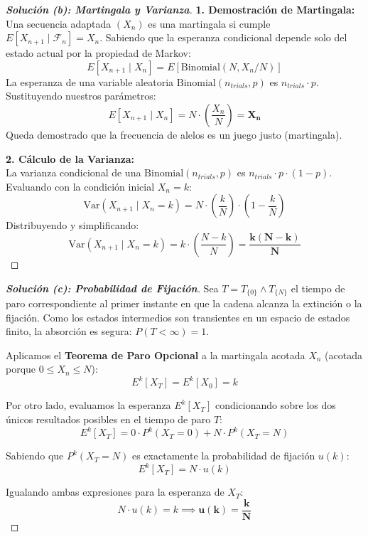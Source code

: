 \documentclass[10pt,a4paper]{article}
\begin{document}
\begin{proof}[\textbf{Solución (b): Martingala y Varianza}]
    \textbf{1. Demostración de Martingala:} \\
    Una secuencia adaptada $(X_n)$ es una martingala si cumple $E[X_{n+1} \mid \mathcal{F}_n] = X_n$.
    Sabiendo que la esperanza condicional depende solo del estado actual por la propiedad de Markov:
    \[ E[X_{n+1} \mid X_n] = E[\text{Binomial}(N, X_n/N)] \]
    La esperanza de una variable aleatoria $\text{Binomial}(n_{trials}, p)$ es $n_{trials} \cdot p$. Sustituyendo nuestros parámetros:
    \[ E[X_{n+1} \mid X_n] = N \cdot \left( \frac{X_n}{N} \right) = \mathbf{X_n} \]
    Queda demostrado que la frecuencia de alelos es un juego justo (martingala).
    
    \textbf{2. Cálculo de la Varianza:} \\
    La varianza condicional de una $\text{Binomial}(n_{trials}, p)$ es $n_{trials} \cdot p \cdot (1-p)$. Evaluando con la condición inicial $X_n = k$:
    \[ \text{Var}(X_{n+1} \mid X_n = k) = N \cdot \left(\frac{k}{N}\right) \cdot \left(1 - \frac{k}{N}\right) \]
    Distribuyendo y simplificando:
    \[ \text{Var}(X_{n+1} \mid X_n = k) = k \cdot \left( \frac{N-k}{N} \right) = \mathbf{\frac{k(N-k)}{N}} \]
\end{proof}

\vspace{5mm}

\begin{proof}[\textbf{Solución (c): Probabilidad de Fijación}]
    Sea $T = T_{\{0\}} \wedge T_{\{N\}}$ el tiempo de paro correspondiente al primer instante en que la cadena alcanza la extinción o la fijación. Como los estados intermedios son transientes en un espacio de estados finito, la absorción es segura: $P(T < \infty) = 1$.
    
    Aplicamos el \textbf{Teorema de Paro Opcional} a la martingala acotada $X_n$ (acotada porque $0 \le X_n \le N$):
    \[ E^k[X_T] = E^k[X_0] = k \]
    
    Por otro lado, evaluamos la esperanza $E^k[X_T]$ condicionando sobre los dos únicos resultados posibles en el tiempo de paro $T$:
    \[ E^k[X_T] = 0 \cdot P^k(X_T = 0) + N \cdot P^k(X_T = N) \]
    
    Sabiendo que $P^k(X_T = N)$ es exactamente la probabilidad de fijación $u(k)$:
    \[ E^k[X_T] = N \cdot u(k) \]
    
    Igualando ambas expresiones para la esperanza de $X_T$:
    \[ N \cdot u(k) = k \implies \mathbf{u(k) = \frac{k}{N}} \]
\end{proof}
\end{document}
